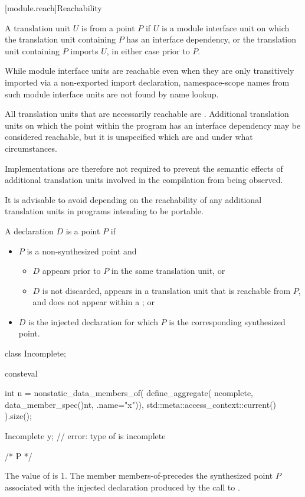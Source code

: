 [module.reach]{Reachability}

\pnum
A translation unit $U$ is
from a point $P$ if
$U$ is a module interface unit on which the translation unit containing $P$
has an interface dependency, or
the translation unit containing $P$ imports $U$,
in either case prior to $P$.
\begin{note}
While module interface units are reachable even when they are only
transitively imported via a non-exported import declaration,
namespace-scope names from such module interface units are not found by
name lookup.
\end{note}

\pnum
All translation units that are necessarily reachable are
.
Additional translation units on which the
point within the program has an interface dependency may be considered reachable,
but it is unspecified which are and under what circumstances.
\begin{footnote}
Implementations are therefore not required to prevent the semantic
effects of additional translation units involved in the compilation from being
observed.
\end{footnote}
\begin{note}
It is advisable to avoid
depending on the reachability of any additional translation units
in programs intending to be portable.
\end{note}

\pnum
A declaration $D$ is
 a point $P$ if
\begin{itemize}
\item
$P$ is a non-synthesized point and
\begin{itemize}
\item $D$ appears prior to $P$ in the same translation unit, or
\item $D$ is not discarded,
appears in a translation unit that is
reachable from $P$,
and
does not appear within a ; or
\end{itemize}
\item
$D$ is the injected declaration
for which $P$ is the corresponding synthesized point.
\end{itemize}
\begin{example}
\begin{codeblock}
class Incomplete;

consteval {
  int n = nonstatic_data_members_of(
      define_aggregate(^^Incomplete, {data_member_spec(^^int, {.name="x"})}),
      std::meta::access_context::current()
    ).size();

  Incomplete y;         // error: type of  is incomplete
}
/* P */
\end{codeblock}
The value of  is 1.
The member 
members-of-precedes
the synthesized point $P$ associated with the injected declaration
produced by the call to .
\end{example}

